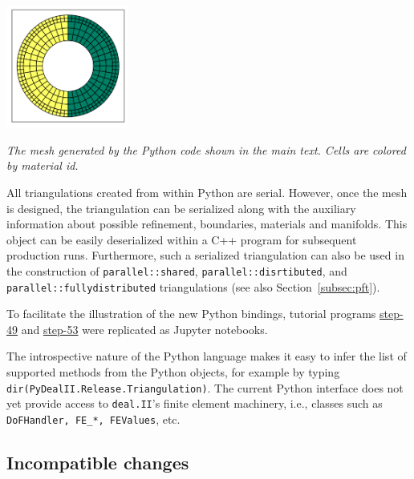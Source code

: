 \documentclass{ansarticle-preprint}
\newcommand{\specialword}[1]{\texttt{#1}}
\newcommand{\dealii}{{\specialword{deal.II}}\xspace}
\begin{document}
\begin{floatingfigure}[r]{0.3\textwidth}
  \centering
  \vspace*{-1.4cm}
  \includegraphics[width=0.3\textwidth]{python_mesh.png}
  \vspace*{-5mm}
  \caption{\it The mesh generated by the Python code shown in the main
    text. Cells are colored by material id.}
  \vspace*{0.2cm}
  \label{fig:pymesh}
\end{floatingfigure}
All triangulations created from within Python are serial. However,
once the mesh is designed, the triangulation can be serialized along
with the auxiliary information about possible refinement, boundaries,
materials and manifolds. This object can be easily deserialized within
a C++ program for subsequent production runs. Furthermore, such a
serialized triangulation can also be used in the construction of
\texttt{parallel::shared}, \texttt{parallel::disrtibuted}, and
\texttt{parallel::fullydistributed} triangulations (see also Section~\ref{subsec:pft}).

To facilitate the illustration of the new Python bindings, tutorial programs \href{https://github.com/dealii/dealii/blob/dealii-9.2/examples/step-49/step-49.ipynb}{step-49} and \href{https://github.com/dealii/dealii/blob/dealii-9.2/examples/step-53/step-53.ipynb}{step-53} were replicated as Jupyter notebooks.

The introspective nature of the Python language makes it easy to infer
the list of supported methods from the Python objects, for example by
typing \texttt{dir(PyDealII.Release.Triangulation)}.
The current Python interface does not yet provide access to \dealii{}'s finite element machinery, i.e., classes such as \texttt{DoFHandler, FE\_*, FEValues}, etc.

\subsection{Incompatible changes}
\end{document}
